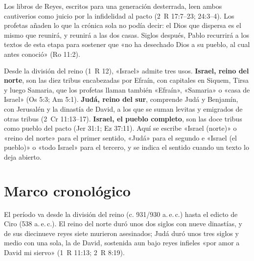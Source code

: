 Los libros de Reyes, escritos para una generación desterrada, leen ambos cautiverios como juicio por la infidelidad al pacto (2~R 17:7--23; 24:3--4). Los profetas añaden lo que la crónica sola no podía decir: el Dios que dispersa es el mismo que reunirá, y reunirá a las dos casas. Siglos después, Pablo recurrirá a los textos de esta etapa para sostener que «no ha desechado Dios a su pueblo, al cual antes conoció» (Ro 11:2).

\begin{nota}
Desde la división del reino (1~R 12), «Israel» admite tres usos. \textbf{Israel, reino del norte}, son las diez tribus encabezadas por Efraín, con capitales en Siquem, Tirsa y luego Samaria, que los profetas llaman también «Efraín», «Samaria» o «casa de Israel» (Os 5:3; Am 5:1). \textbf{Judá, reino del sur}, comprende Judá y Benjamín, con Jerusalén y la dinastía de David, a los que se suman levitas y emigrados de otras tribus (2~Cr 11:13--17). \textbf{Israel, el pueblo completo}, son las doce tribus como pueblo del pacto (Jer 31:1; Ez 37:11). Aquí se escribe «Israel (norte)» o «reino del norte» para el primer sentido, «Judá» para el segundo e «Israel (el pueblo)» o «todo Israel» para el tercero, y se indica el sentido cuando un texto lo deja abierto.
\end{nota}


\section{Marco cronológico}

El período va desde la división del reino (c. 931/930 a.\,e.\,c.) hasta el edicto de Ciro (538 a.\,e.\,c.). El reino del norte duró unos dos siglos con nueve dinastías, y de sus diecinueve reyes siete murieron asesinados; Judá duró unos tres siglos y medio con una sola, la de David, sostenida aun bajo reyes infieles «por amor a David mi siervo» (1~R 11:13; 2~R 8:19).

